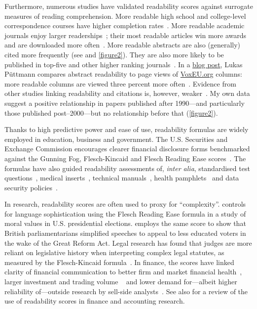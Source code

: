 \begin{appendices}
\begin{refsection}
Furthermore, numerous studies have validated readability scores against surrogate measures of reading comprehension. More readable high school and college-level correspondence courses have higher completion rates~\citep{Klare1973}. More readable academic journals enjoy larger readerships~\citep{Richardson1977,Swanson1948}; their most readable articles win more awards~\citep{Sawyer2008} and are downloaded more often~\citep{Guerini2012}. More readable abstracts are also (generally) cited more frequently (see  \citet{Dowling2018,McCannon2019} and \autoref{figure2}). They are also more likely to be published in top-five and other higher ranking journals~\citep{MarinoFages2020}. In a \href{http://lukaspuettmann.com/2017/12/09/voxeu-gobbledygook/}{blog post}, Lukas Püttmann compares abstract readability to page views of \href{http://www.voxeu.org}{VoxEU.org} columns: more readable columns are viewed three percent more often~\citep{Puttmann2017}. Evidence from other studies linking readability and citations is, however, weaker~\citep{Lei2016, Berninger2017,Laband1992}. My own data suggest a positive relationship in papers published after 1990---and particularly those published post--2000---but no relationship before that (\autoref{figure2}).

Thanks to high predictive power and ease of use, readability formulas are widely employed in education, business and government. The U.S. Securities and Exchange Commission encourages clearer financial disclosure forms benchmarked against the Gunning Fog, Flesch-Kincaid and Flesch Reading Ease scores~\citep{Cox2007}. The formulas have also guided readability assessments of, \emph{inter alia}, standardised test questions~\citep{Chall1977,Chall1983}, medical inserts~\citep[\emph{e.g.},][]{Wallace2008}, technical manuals~\citep[\emph{e.g.},][]{Hussin2012,Klare1973}, health pamphlets~\citep[\emph{e.g.},][]{Foster2002,Meade1989} and data security policies~\citep{Alkhurayyif2017}.

In research, readability scores are often used to proxy for ``complexity''.  \citet{Enke2018} controls for language sophistication using the Flesch Reading Ease formula in a study of moral values in U.S. presidential elections.  \citet{Spirling2016} employs the same score to show that British parliamentarians simplified speeches to appeal to less educated voters in the wake of the Great Reform Act. Legal research has found that judges are more reliant on legislative history when interpreting complex legal statutes, as measured by the Flesch-Kincaid formula~\citep{Law2010}. In finance, the scores have linked clarity of financial communication to better firm and market financial health~\citep{Li2008,Biddle2009,Jansen2011}, larger investment and trading volume ~\citep{Miller2010,Thörnqvist2015,DeFranco2015,Lawrence2013} and lower demand for---albeit higher reliability of---outside research by sell-side analysts~\citep{Lehavy2011}. See also  \citet{Loughran2016} for a review of the use of readability scores in finance and accounting research.


\end{refsection}
\end{appendices}
